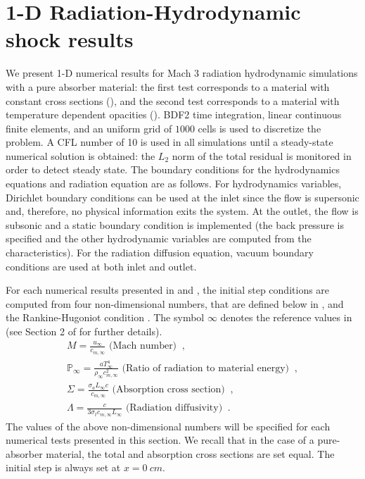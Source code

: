 \documentclass[times]{fldauth}
\begin{document}
\section{1-D Radiation-Hydrodynamic shock results}
\label{sec:num-rslt}
%
We present 1-D numerical results for Mach 3 radiation hydrodynamic simulations with a pure absorber material: the first test corresponds to a material with constant cross sections (), and the second test corresponds to a material with temperature dependent opacities (). BDF2 time integration, linear continuous finite elements, and an uniform grid of $1000$ cells is used to discretize the problem. A CFL number of 10 is 
used in all simulations until a steady-state numerical solution is obtained: the $L_2$ norm of the total residual is monitored in order to detect steady state. 
The boundary conditions for the hydrodynamics equations and radiation equation are as follows. For hydrodynamics variables, Dirichlet boundary conditions can be used
at the inlet since the flow is supersonic and, therefore, no physical information exits the system. At the outlet, the flow is subsonic and a static 
  boundary condition is implemented (the back pressure is specified and the other hydrodynamic variables are computed from the characteristics). 
For the radiation diffusion equation, vacuum boundary conditions are used at both inlet and outlet. 

For each numerical results presented in  and , the initial step conditions are computed from four non-dimensional numbers, that are defined below in , and the Rankine-Hugoniot condition \cite{toro, LowrieEdwards}. The symbol $\infty$ denotes the reference values in  (see Section 2 of \cite{LowrieEdwards} for further details).
%
\begin{eqnarray}\label{eq:scaled-nb}
M = \frac{u_\infty}{c_{m,\infty}} \text{ (Mach number) } \ , \\
\mathbb{P}_\infty = \frac{a T^4_\infty}{\rho_\infty c^2_{m,\infty} } \text{ (Ratio of radiation to material energy) } \ , \\
\mathbb{\Sigma} =  \frac{\sigma_a L_\infty c}{c_{m,\infty}} \text{ (Absorption cross section) } \ , \\
\mathbb{\Lambda} = \frac{c}{3 \sigma_t c_{m,\infty} L_\infty} \text{ (Radiation diffusivity) } \ .
\end{eqnarray}
%
The values of the above non-dimensional numbers will be specified for each numerical tests presented in this section. We recall that in the case of a pure-absorber material, the total and absorption cross sections are set equal. The initial step is always set at $x = 0 \ cm$.
%
\end{document}
